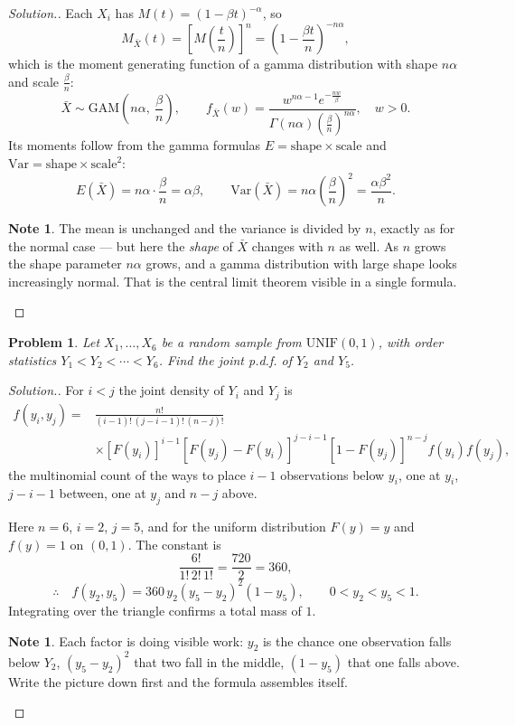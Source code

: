 \documentclass[12pt,a4paper]{report}
\theoremstyle{definition}
\newtheorem{note}[thm]{Note}
\theoremstyle{plain}
\newtheorem{problemx}{Problem}[section]
\newenvironment{problem}{\begin{problemx}}{\end{problemx}}
\newenvironment{solution}
  {\renewcommand{\qedsymbol}{}\begin{proof}[\textit{Solution}.]}
  {\end{proof}}
\begin{document}
\begin{solution}
Each $X_i$ has $M(t)=(1-\beta t)^{-\alpha}$, so
\[M_{\bar X}(t)=\left[M\!\left(\frac{t}{n}\right)\right]^n
=\left(1-\frac{\beta t}{n}\right)^{-n\alpha},\]
which is the moment generating function of a gamma distribution with shape
$n\alpha$ and scale $\frac{\beta}{n}$:
\[\bar X\sim\text{GAM}\!\left(n\alpha,\ \frac{\beta}{n}\right),\qquad
f_{\bar X}(w)=\frac{w^{n\alpha-1}e^{-\frac{nw}{\beta}}}
{\Gamma(n\alpha)\left(\frac{\beta}{n}\right)^{n\alpha}},\quad w>0.\]
Its moments follow from the gamma formulas $E=\text{shape}\times\text{scale}$ and
$\text{Var}=\text{shape}\times\text{scale}^2$:
\[E\left(\bar X\right)=n\alpha\cdot\frac{\beta}{n}=\alpha\beta,\qquad
\text{Var}\left(\bar X\right)=n\alpha\left(\frac{\beta}{n}\right)^2
=\frac{\alpha\beta^2}{n}.\]

\begin{note}
The mean is unchanged and the variance is divided by $n$, exactly as for the
normal case --- but here the \emph{shape} of $\bar X$ changes with $n$ as well.
As $n$ grows the shape parameter $n\alpha$ grows, and a gamma distribution with
large shape looks increasingly normal. That is the central limit theorem visible
in a single formula.
\end{note}
\end{solution}

\begin{problem}
Let $X_1,\ldots,X_6$ be a random sample from $\text{UNIF}(0,1)$, with order
statistics $Y_1<Y_2<\cdots<Y_6$. Find the joint p.d.f. of $Y_2$ and $Y_5$.
\end{problem}

\begin{solution}
For $i<j$ the joint density of $Y_i$ and $Y_j$ is
\begin{align*}
f(y_i,y_j)={}&\frac{n!}{(i-1)!\,(j-i-1)!\,(n-j)!}\\
&\times\left[F(y_i)\right]^{i-1}
\left[F(y_j)-F(y_i)\right]^{j-i-1}
\left[1-F(y_j)\right]^{n-j}f(y_i)f(y_j),
\end{align*}
the multinomial count of the ways to place $i-1$ observations below $y_i$, one
at $y_i$, $j-i-1$ between, one at $y_j$ and $n-j$ above.

Here $n=6$, $i=2$, $j=5$, and for the uniform distribution $F(y)=y$ and
$f(y)=1$ on $(0,1)$. The constant is
\[\frac{6!}{1!\,2!\,1!}=\frac{720}{2}=360,\]
\[\therefore\quad f(y_2,y_5)=360\,y_2\left(y_5-y_2\right)^2\left(1-y_5\right),
\qquad 0<y_2<y_5<1.\]
Integrating over the triangle confirms a total mass of $1$.

\begin{note}
Each factor is doing visible work: $y_2$ is the chance one observation falls
below $Y_2$, $(y_5-y_2)^2$ that two fall in the middle, $(1-y_5)$ that one falls
above. Write the picture down first and the formula assembles itself.
\end{note}
\end{solution}
\end{document}
